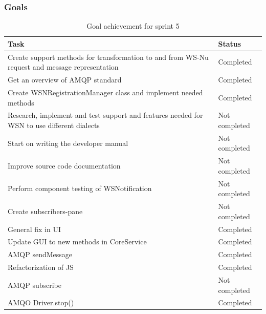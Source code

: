 \subsubsection{Goals}
\label{subsec:project_lifecycle-development-sprint_5-goals}

\begin{table}[ht!]
\small
\centering
\begin{tabular}{ | p{10cm} | p{2cm} |}
\hline
 \rowcolor{lightgray}
 \textbf{Task} & \textbf{Status} \\
\hline
\rowcolor{green!30}
Create support methods for transformation to and from WS-Nu request and message representation & Completed \\
\rowcolor{green!30}
Get an overview of AMQP standard & Completed \\
\rowcolor{green!30}
Create WSNRegistrationManager class and implement needed methods & Completed \\
\rowcolor{orange!40}
Research, implement and test support and features needed for WSN to use different dialects	& Not completed \\
\rowcolor{orange!40}
Start on writing the developer manual & Not completed \\
\rowcolor{orange!40}
Improve source code documentation & Not completed \\
\rowcolor{orange!40}
Perform component testing of WSNotification	& Not completed \\
\rowcolor{orange!40}
Create subscribers-pane	& Not completed \\
\rowcolor{green!30}
General fix in UI & Completed \\
\rowcolor{green!30}
Update GUI to new methods in CoreService & Completed \\
\rowcolor{green!30}
AMQP sendMessage & Completed \\
\rowcolor{green!30}
Refactorization of JS & Completed \\
\rowcolor{orange!40}
AMQP subscribe & Not completed \\
\rowcolor{green!30}
AMQO Driver.stop() & Completed \\
\hline
\end{tabular}
\caption{Goal achievement for sprint 5}
\label{tab:sprint 4, goals}
\end{table}

